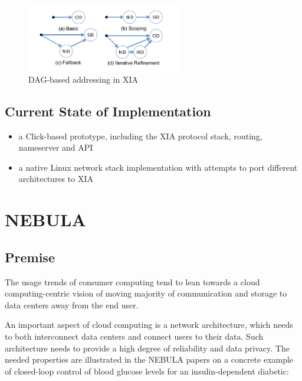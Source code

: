                 \begin{figure}[H]
                    \begin{center}
                        \includegraphics[width=0.6\textwidth]{fig/archs_xia-dag.png}
                        \caption{DAG-based addressing in XIA}
                        \label{fig:xia_dag}
                    \end{center}
                \end{figure}

        \subsection{Current State of Implementation}

            \begin{itemize}
                \item a Click-based prototype, including the XIA protocol stack, routing, nameserver and API
                \item a native Linux network stack implementation with attempts to port different architectures to XIA
            \end{itemize}


    \section{NEBULA}\label{archs:nebula}

        \subsection{Premise}

            The usage trends of consumer computing tend to lean towards a cloud computing-centric vision of moving majority of communication and storage to data centers away from the end user.

            An important aspect of cloud computing is a network architecture, which needs to both interconnect data centers and connect users to their data. Such architecture needs to provide a high degree of reliability and data privacy. The needed properties are illustrated in the NEBULA papers on a concrete example of closed-loop control of blood glucose levels for an insulin-dependent diabetic:

